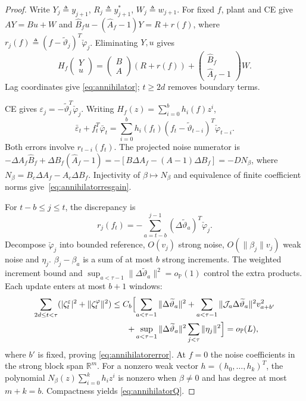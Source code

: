 \documentclass[11pt,reqno]{amsart}
\numberwithin{equation}{section}
\theoremstyle{definition}
\theoremstyle{remark}
\newcommand{\R}{\mathbb R}
\newcommand{\Prob}{\mathbb P}
\newcommand{\ph}{\varphi}
\newcommand{\phc}{\check{\varphi}}
\newcommand{\etac}{\widetilde{\vartheta}}
\begin{document}
\begin{proof}
Write $Y_j\triangleq y_{j+1}$, $R_j\triangleq y^*_{j+1}$, $W_j\triangleq w_{j+1}$. For fixed $f$, plant and CE give $AY=Bu+W$ and $\widehat B_fu-(\widehat A_f-1)Y=R+r(f)$, where $r_j(f)\triangleq(f-\etac_j)^T\phc_j$. Eliminating $Y,u$ gives
\begin{equation*}
 H_f
 \begin{pmatrix}Y\\u\end{pmatrix}
 =\begin{pmatrix}B\\A\end{pmatrix}(R+r(f))+
   \begin{pmatrix}\widehat B_f\\\widehat A_f-1\end{pmatrix}W.
\end{equation*}
Lag coordinates give \eqref{eq:annihilator}; $t\ge2d$ removes boundary terms.

CE gives $\varepsilon_j=-\etac_j^T\phc_j$. Writing $H_f(z)=\sum_{i=0}^b h_i(f)z^i$,
\begin{equation*}
 \bar\varepsilon_t+f_t^T\bar\ph_t
 =\sum_{i=0}^{b}h_i(f_t)
       (f_t-\etac_{t-i})^T\phc_{t-i}.
\end{equation*}
Both errors involve $r_{t-i}(f_t)$. The projected noise numerator is
$-\Delta A_f\widehat B_f+\Delta B_f(\widehat A_f-1)
 =-[B\Delta A_f-(A-1)\Delta B_f]=-DN_\beta$,
where $N_\beta=B_c\Delta A_f-A_c\Delta B_f$.
Injectivity of $\beta\mapsto N_\beta$ and equivalence of finite coefficient norms give~\eqref{eq:annihilatorresgain}.


For $t-b\le j\le t$, the discrepancy is
\[
 r_j(f_t)=-\sum_{a=t-b}^{j-1}
  (\Delta\etac_a)^T\phc_j.
\]
Decompose $\phc_j$ into bounded reference, $O(v_j)$ strong noise, $O(\|\beta_j\|v_j)$ weak noise and $\eta_j$. $\beta_j-\beta_a$ is a sum of at most $b$ strong increments. The weighted increment bound and $\sup_{a<\tau-1}\|\Delta\etac_a\|^2=o_{\Prob}(1)$ control the extra products. Each update enters at most $b+1$ windows:
\[
 \begin{aligned}
 \sum_{2d\le t<\tau}(|\zeta_t^\varepsilon|^2+\|\zeta_t^\ph\|^2)
 &\le C_b\Bigl[\sum_{a<\tau-1}\|\Delta\etac_a\|^2
 +\sum_{a<\tau-1}\|\mathcal J_a\Delta\etac_a\|^2v_{a+b'}^2\Bigr.\\
 &\qquad\Bigl.+\sup_{a<\tau-1}\|\Delta\etac_a\|^2
   \sum_{j<\tau}\|\eta_j\|^2\Bigr]=o_{\Prob}(L),
 \end{aligned}
\]
where $b'$ is fixed, proving \eqref{eq:annihilatorerror}.
At $f=0$ the noise coefficients in the strong block span $\R^m$. For a nonzero weak vector $h=(h_0,\ldots,h_k)^T$, the polynomial $N_\beta(z)\sum_{i=0}^kh_iz^i$ is nonzero when $\beta\ne0$ and has degree at most $m+k=b$. Compactness yields \eqref{eq:annihilatorQ}.


\end{proof}
\end{document}
